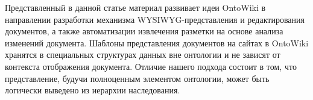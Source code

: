 \documentclass[utf8]{../IncArticle}
\newcommand{\e}[2][fcolor]{\textcolor{pcolor}{[}\textcolor{#1}{#2}\textcolor{pcolor}{]}}
\begin{document}
Представленный в данной статье материал развивает идеи OntoWiki в
направлении разработки механизма WYSIWYG-представления и
редактирования документов, а также автоматизации извлечения разметки
на основе анализа изменений документа.  Шаблоны представления
документов на сайтах в OntoWiki хранятся в специальных структурах
данных вне онтологии и не зависят от контекста отображения документа.
Отличие нашего подхода состоит в том, что представление, будучи
полноценным элементом онтологии, может быть логически выведено из
иерархии наследования.







\end{document}
